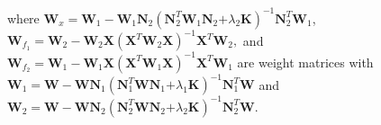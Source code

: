 \documentclass[article,lineno]{biometrika}
\begin{document}
where 
$ \boldsymbol W_x =
 \boldsymbol W_1 
 -
\boldsymbol W_1 \boldsymbol N_2 
 (\boldsymbol N_2^T  \boldsymbol W_1 \boldsymbol N_2 \boldsymbol 
 + \lambda_2 \boldsymbol K)^{-1} 
 \boldsymbol N_2^T  \boldsymbol W_1$, 
 $\boldsymbol W_{f_1}  =  \boldsymbol W_2 - \boldsymbol W_2\boldsymbol X(\boldsymbol X^T  \boldsymbol W_2\boldsymbol X)^{-1}  \boldsymbol X^T  \boldsymbol W_2,$
 and 
 $\boldsymbol W_{f_2}  =  \boldsymbol W_1 - \boldsymbol W_1\boldsymbol X(\boldsymbol X^T  \boldsymbol W_1\boldsymbol X)^{-1}  \boldsymbol X^T  \boldsymbol W_1$ are weight matrices
 with
 $ \boldsymbol W_1 =
 \boldsymbol W 
 -
\boldsymbol W \boldsymbol N_1 
 (\boldsymbol N_1^T  \boldsymbol W \boldsymbol N_1 \boldsymbol 
 + \lambda_1 \boldsymbol K)^{-1} 
 \boldsymbol N_1^T  \boldsymbol W$
 and
 $ \boldsymbol W_2 =
 \boldsymbol W 
 -
\boldsymbol W \boldsymbol N_2 
 (\boldsymbol N_2^T  \boldsymbol W \boldsymbol N_2 \boldsymbol 
 + \lambda_2 \boldsymbol K)^{-1} 
 \boldsymbol N_2^T  \boldsymbol W$.
\end{document}

